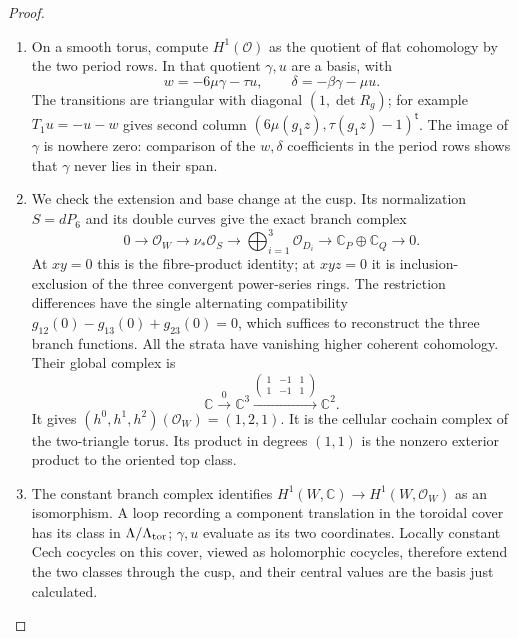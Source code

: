 \begin{proof}
\begin{enumerate}[label=\arabic*.,leftmargin=*]
\item On a smooth torus, compute $H^1(\mathcal O)$ as the quotient of flat
cohomology by the two period rows.  In that quotient $\gamma,u$ are a
basis, with
\[
 w=-6\mu\gamma-\tau u,\qquad \delta=-\beta\gamma-\mu u.
\]
The transitions are triangular with diagonal $(1,\det R_g)$; for example
$T_1u=-u-w$ gives second column
$(6\mu(g_1z),\tau(g_1z)-1)^{\mathsf t}$.  The image of $\gamma$ is
nowhere zero: comparison of the $w,\delta$ coefficients in the period
rows shows that $\gamma$ never lies in their span.

\item We check the extension and base change at the cusp.  Its normalization
$S=dP_6$ and its double curves give the exact branch complex
\begin{equation}\label{eq:P5normalization}
0\to\mathcal O_W\to\nu_*\mathcal O_S\to
 \bigoplus_{i=1}^3\mathcal O_{D_i}\to
 \mathbb C_P\oplus\mathbb C_Q\to0.
\end{equation}
At $xy=0$ this is the fibre-product identity; at $xyz=0$ it is
inclusion-exclusion of the three convergent power-series rings.  The
restriction differences have the single alternating compatibility
$g_{12}(0)-g_{13}(0)+g_{23}(0)=0$, which suffices to reconstruct the
three branch functions.  All the strata have vanishing higher coherent
cohomology.  Their global complex is
\[
 \mathbb C\xrightarrow{0}\mathbb C^3
 \xrightarrow{\left(\begin{smallmatrix}1&-1&1\\1&-1&1\end{smallmatrix}\right)}
 \mathbb C^2.
\]
It gives $(h^0,h^1,h^2)(\mathcal O_W)=(1,2,1)$.  It is the cellular
cochain complex of the two-triangle torus.  Its product in degrees
$(1,1)$ is the nonzero exterior product to the oriented top class.

\item The constant branch complex identifies
$H^1(W,\mathbb C)\to H^1(W,\mathcal O_W)$ as an isomorphism.  A loop
recording a component translation in the toroidal cover has its class
in $\Lambda/\Lambda_{\rm tor}$; $\gamma,u$ evaluate as its two
coordinates.  Locally constant Cech cocycles on this cover, viewed as
holomorphic cocycles, therefore extend the two classes through the
cusp, and their central values are the basis just calculated.


\end{enumerate}
\end{proof}
